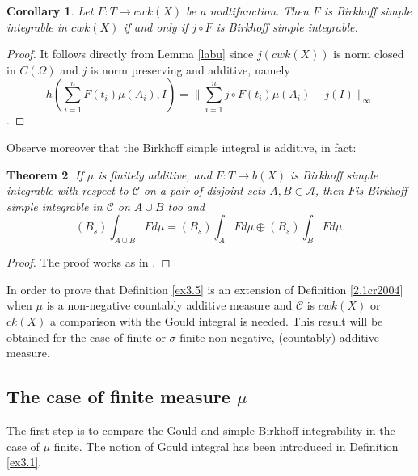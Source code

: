 \documentclass[11pt,a4paper,twoside]{amsart}
\newtheorem{theorem}{Theorem}[section]
\newtheorem{corollary}[theorem]{Corollary}
\begin{document}
\begin{corollary}\label{jFsB}
Let $F : T \to cwk(X)$ be a multifunction. Then $F$ is Birkhoff simple integrable  in $cwk(X)$ if and only if $j \circ F$ is
Birkhoff simple integrable.
\end{corollary}
\begin{proof}
It follows directly from Lemma \ref{labu} since $j(cwk(X))$   is norm closed in $C (\Omega)$ and 
$j$ is norm preserving and additive,
namely
\[ h\left(\sum_{i=1}^n F(t_i)\mu(A_i),I\right) = \| \sum_{i=1}^n j \circ F(t_i) \mu(A_i) - j(I) \|_{\infty} \].
\end{proof}

Observe moreover that the Birkhoff simple integral is additive, in fact:
\begin{theorem}\label{ex3.7}
 If $\mu$ is finitely additive, and $F:T\rightarrow b(X)$  is Birkhoff simple integrable
with respect to  $\mathcal{C}$ 
 on a pair of disjoint sets  $A,B\in \mathcal{A}$, 
then $F$is Birkhoff simple integrable
in $\mathcal{C}$ on $A\cup B$ too and 
$$(B_s)\int_{A\cup B}Fd\mu = (B_s)\int_{A}Fd\mu \oplus (B_s)\int_{B}Fd\mu . $$
\end{theorem}
\begin{proof}
The proof works as in \cite[Theorem 4.1]{cgsub1}.
\end{proof}

In order to prove that Definition \ref{ex3.5} is an extension of
 Definition \ref{2.1cr2004}  when $\mu$ is a non-negative countably additive measure and $\mathcal{C}$ is $cwk(X)$ or $ck(X)$ a comparison with the Gould integral is needed. 
This result will be obtained for the case of finite or $\sigma$-finite
non negative, (countably) additive measure.
\subsection{The case of  finite measure $\mu$}\label{three.1}
The first step is to compare the Gould and simple Birkhoff integrability in the case of $\mu$ finite. 
 The notion of Gould integral has been introduced in Definition  \ref{ex3.1}. 
\end{document}
